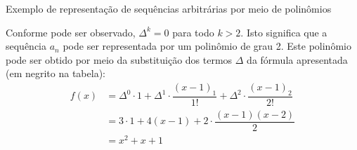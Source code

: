 \begin{frame}[fragile]{Exemplo de representação de sequências arbitrárias por meio de polinômios}

Conforme pode ser observado, $\Delta^k = 0$ para todo $k > 2$. Isto significa que a sequência $a_n$ pode ser representada por um polinômio de grau 2. Este polinômio pode ser obtido por meio da substituição dos termos $\Delta$ da fórmula apresentada (em negrito na tabela):
\begin{align*}
    f(x) &= \Delta^0 \cdot 1 + \Delta^1 \cdot \dfrac{(x - 1)_1}{1!} + \Delta^2\cdot \dfrac{(x - 1)_2}{2!} \\
    &= 3\cdot 1 + 4(x - 1) + 2\cdot \dfrac{(x - 1)(x - 2)}{2} \\
    &= x^2 + x  + 1 \\
\end{align*}

\end{frame}
